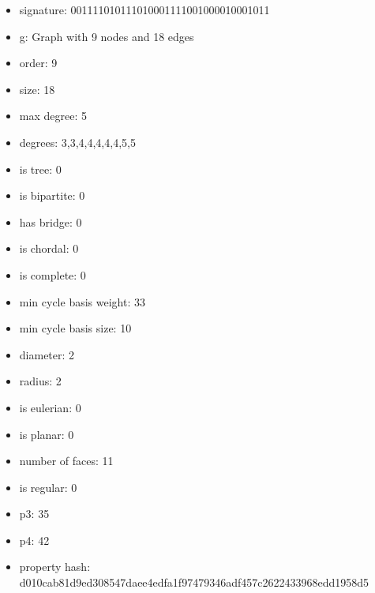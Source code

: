 \newpage
\begin{figure}
\end{figure}
\begin{itemize}
\item signature: 001111010111010001111001000010001011
\item g: Graph with 9 nodes and 18 edges
\item order: 9
\item size: 18
\item max degree: 5
\item degrees: 3,3,4,4,4,4,4,5,5
\item is tree: 0
\item is bipartite: 0
\item has bridge: 0
\item is chordal: 0
\item is complete: 0
\item min cycle basis weight: 33
\item min cycle basis size: 10
\item diameter: 2
\item radius: 2
\item is eulerian: 0
\item is planar: 0
\item number of faces: 11
\item is regular: 0
\item p3: 35
\item p4: 42
\item property hash: d010cab81d9ed308547daee4edfa1f97479346adf457c2622433968edd1958d5
\end{itemize}
